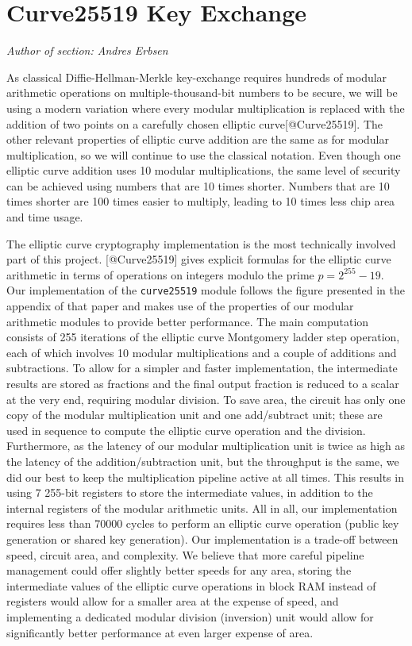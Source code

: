 \section{Curve25519 Key Exchange}\label{curve25519-key-exchange}

\emph{Author of section: Andres Erbsen}

As classical Diffie-Hellman-Merkle key-exchange requires hundreds of
modular arithmetic operations on multiple-thousand-bit numbers to be
secure, we will be using a modern variation where every modular
multiplication is replaced with the addition of two points on a
carefully chosen elliptic curve{[}@Curve25519{]}. The other relevant
properties of elliptic curve addition are the same as for modular
multiplication, so we will continue to use the classical notation. Even
though one elliptic curve addition uses 10 modular multiplications, the
same level of security can be achieved using numbers that are 10 times
shorter. Numbers that are 10 times shorter are 100 times easier to
multiply, leading to 10 times less chip area and time usage.

The elliptic curve cryptography implementation is the most technically
involved part of this project. {[}@Curve25519{]} gives explicit formulas
for the elliptic curve arithmetic in terms of operations on integers
modulo the prime \(p=2^{255} -19\). Our implementation of the
\texttt{curve25519} module follows the figure presented in the appendix
of that paper and makes use of the properties of our modular arithmetic
modules to provide better performance. The main computation consists of
255 iterations of the elliptic curve Montgomery ladder step operation,
each of which involves 10 modular multiplications and a couple of
additions and subtractions. To allow for a simpler and faster
implementation, the intermediate results are stored as fractions and the
final output fraction is reduced to a scalar at the very end, requiring
modular division. To save area, the circuit has only one copy of the
modular multiplication unit and one add/subtract unit; these are used in
sequence to compute the elliptic curve operation and the division.
Furthermore, as the latency of our modular multiplication unit is twice
as high as the latency of the addition/subtraction unit, but the
throughput is the same, we did our best to keep the multiplication
pipeline active at all times. This results in using 7 255-bit registers
to store the intermediate values, in addition to the internal registers
of the modular arithmetic units. All in all, our implementation requires
less than 70000 cycles to perform an elliptic curve operation (public
key generation or shared key generation). Our implementation is a
trade-off between speed, circuit area, and complexity. We believe that
more careful pipeline management could offer slightly better speeds for
any area, storing the intermediate values of the elliptic curve
operations in block RAM instead of registers would allow for a smaller
area at the expense of speed, and implementing a dedicated modular
division (inversion) unit would allow for significantly better
performance at even larger expense of area.


